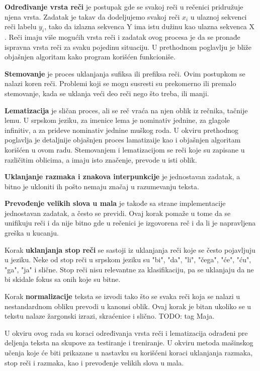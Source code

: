 \documentclass[12pt,oneside]{memoir}
\begin{document}
\textbf{Određivanje vrsta reči} je postupak gde se svakoj reči u rečenici pridružuje njena vrsta. Zadatak je takav da dodeljujemo svakoj reči $x_i$ u ulaznoj sekvenci reči labelu $y_i$,  tako da izlazna sekvenca Y ima istu dužinu kao ulazna sekvenca X \cite{postagging}. Reči imaju više mogućih vrsta reči i zadatak ovog procesa je da se pronađe ispravna vrsta reči za svaku pojedinu situaciju. U prethodnom poglavlju je bliže objašnjen algoritam kako program korišćen funkcioniše.

\textbf{Stemovanje} je proces uklanjanja sufiksa ili prefiksa reči. Ovim postupkom se nalazi koren reči. Problemi koji se mogu susresti su prekomerno ili premalo stemovanje, kada se uklanja veći deo reči nego što treba, ili manji.

\textbf{Lematizacija} je sličan proces, ali se reč vraća na njen oblik iz rečnika, tačnije lemu. U srpskom jeziku, za imenice lema je nominativ jednine,  za glagole infinitiv, a za prideve nominativ jednine muškog roda. U okviru prethodnog poglavlja je detaljnije objašnjen proces lamatizaije kao i objašnjen algoritam korišćen u ovom radu. Stemovanjem i lematizacijom se reči koje su zapisane u različitim oblicima, a imaju isto značenje, prevode u isti oblik.

\textbf{Uklanjanje razmaka i znakova interpunkcije} je jednostavan zadatak, a bitno je ukloniti ih pošto nemaju značaj u razumevanju teksta.
 
\textbf{Prevođenje velikih slova u mala} je takođe sa strane implementacije jednostavan zadatak, a često se previdi. Ovaj korak pomaže u tome da se unifikuju reči i da nije bitno gde u rečenici je izgovorena reč i da li je napravljena greška u kucanju.

Korak \textbf{uklanjanja stop reči} se sastoji iz uklanjanja reči koje se često pojavljuju u jeziku. Neke od stop reči u srpskom jeziku su "bi", "da", "li", "čega", "će", "ću", "ga", "ja" i slične. Stop reči nisu relevantne za klasifikaciju, pa se uklanjaju da ne bi skidale fokus sa onih koje su bitne.

Korak \textbf{normalizacije} teksta se izvodi tako što se svaka reči koja se nalazi u nestandardnom obliku prevodi u kanonsi oblik. Ovaj korak je bitan ukoliko se u tekstu nalaze žargonski izrazi, skraćenice i slično. TODO: tag Maja.

U okviru ovog rada su koraci određivanja vrsta reči i lematizacija odrađeni pre deljenja teksta na skupove za testiranje i treniranje. U okviru metoda mašinskog učenja koje će biti prikazane u nastavku su korišćeni koraci uklanjanja razmaka, stop reči i razmaka, kao i prevođenje velikih slova u mala.
\end{document}

